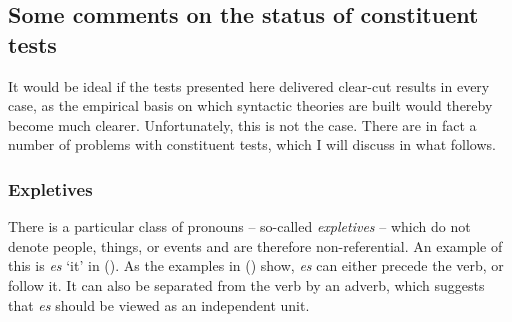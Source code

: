 \subsection{Some comments on the status of constituent tests}
\label{sec-status-der-ktests}

It would be ideal if the tests presented here delivered clear-cut results in every case, as the empirical
basis on which syntactic theories are built would thereby become much clearer. Unfortunately, this is not the case.
There are in fact a number of problems with constituent tests, which I will discuss in what follows.

\subsubsection{Expletives}

There is a particular class of pronouns -- so-called \emph{expletives} -- which do not denote
people, things, or events and are therefore non-referential. An example of this is \emph{es} `it' in ().
\eal
{}
\zl
As the examples in () show, \emph{es} can either precede the verb, or follow it. It can also be separated from the verb
by an adverb, which suggests that \emph{es} should be viewed as an independent unit.

